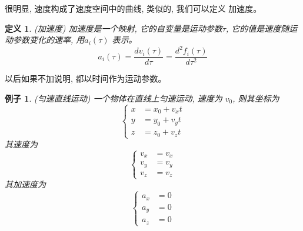 \documentclass{ctexart}
\numberwithin{equation}{subsection}
\numberwithin{theorem}{subsection}
\newtheorem{definition} {定义}
\numberwithin{definition}{subsection}
\numberwithin{proof}{subsection}
\numberwithin{lemma}{subsection}
\newtheorem{example}    {例子}
\numberwithin{example}{subsection}
\numberwithin{remark}{subsection}
\numberwithin{corollary}{subsection}
\numberwithin{exercise}{subsection}
\numberwithin{problem}{subsection}
\numberwithin{question}{section}
\numberwithin{method}{subsection}
\begin{document}
    很明显, 速度构成了速度空间中的曲线, 类似的, 我们可以定义
    加速度。
    \begin{definition}
        \label{1.2 eq:acceleration}
        (加速度) 加速度是一个映射, 它的自变量是运动参数\(\tau\),
        它的值是速度随运动参数变化的速率, 用\(a_i(\tau)\)
        表示。
        \begin{equation}
            a_i(\tau) = \frac{d v_i(\tau)}{d \tau} = \frac{d^2 f_i(\tau)}{d \tau^2}
        \end{equation}
    \end{definition}

    以后如果不加说明, 都以时间作为运动参数。

    \begin{example}
        \label{1.2 ex:constant speed}
        (匀速直线运动) 一个物体在直线上匀速运动, 速度为
        \(v_0\), 则其坐标为
        \begin{equation}
            \begin{cases}
                x &= x_0 + v_x t \\
                y &= y_0 + v_y t \\
                z &= z_0 + v_z t
            \end{cases}
        \end{equation}
        其速度为
        \begin{equation}
            \begin{cases}
                v_x &= v_x \\
                v_y &= v_y \\
                v_z &= v_z
            \end{cases}
        \end{equation}
        其加速度为
        \begin{equation}
            \begin{cases}
                a_x &= 0 \\
                a_y &= 0 \\
                a_z &= 0
            \end{cases}
        \end{equation}
    \end{example}
\end{document}
